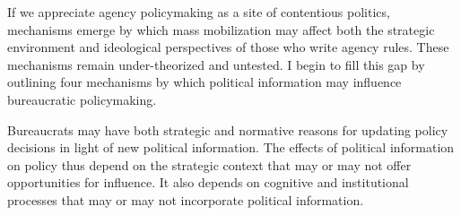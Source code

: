 If we appreciate agency policymaking as a site of contentious politics, mechanisms emerge by which mass mobilization may affect both the strategic environment and ideological perspectives of those who write agency rules. These mechanisms remain under-theorized and untested. I begin to fill this gap by outlining four mechanisms by which political information may influence bureaucratic policymaking. 

Bureaucrats may have both strategic and normative reasons for updating policy decisions in light of new political information. The effects of political information on policy thus depend on the strategic context that may or may not offer opportunities for influence. It also depends on cognitive and institutional processes that may or may not incorporate political information.




